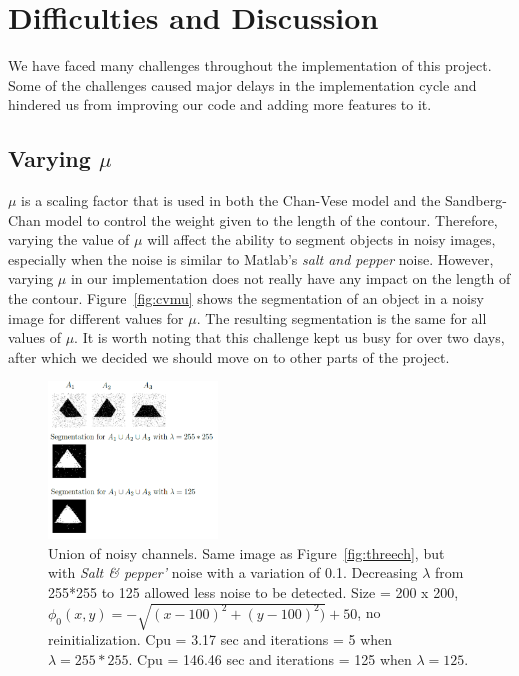 \documentclass[10pt,twocolumn,letterpaper]{article}
\begin{document}
\section{Difficulties and Discussion}
\label{sec:difficulties}
We have faced many challenges throughout the implementation of this project. Some of the challenges caused major delays in the implementation cycle and hindered
us from improving our code and adding more features to it. 

\subsection{Varying $\mu$}
$\mu$ is a scaling factor that is used in both the Chan-Vese model and the Sandberg-Chan model to control the weight given to the length of the contour.
Therefore, varying the value of $\mu$ will affect the ability to segment objects in noisy images, especially when the noise is similar to Matlab's \textit{salt
and pepper} noise. However, varying $\mu$ in our implementation does not really have any impact on the length of the contour. Figure~\ref{fig:cvmu} shows the
segmentation of an object in a noisy image for different values for $\mu$. The resulting segmentation is the same for all values of $\mu$. It is worth noting
that
this challenge kept us busy for over two days, after which we decided we should move on to other parts of the project.



\begin{figure}[t]
\centering
\includegraphics[width=0.4\textwidth]{sc_noisy.png}
\caption{Union of noisy channels. Same image as Figure~\ref{fig:threech}, but with \textit{Salt \& pepper'} noise with a variation of 0.1. Decreasing $\lambda$
from 255*255 to 125 allowed less
noise to be detected. Size = 200 x 200, $\phi_{0}(x,y) = - \sqrt{(x - 100)^2 + (y - 100)^2)} +
50$, no reinitialization. Cpu = 3.17 sec and iterations = 5 when $\lambda = 255*255$. Cpu = 146.46 sec and iterations = 125 when $\lambda =
125$.}
\label{fig:sc_noisy}
\end{figure}
\end{document}
